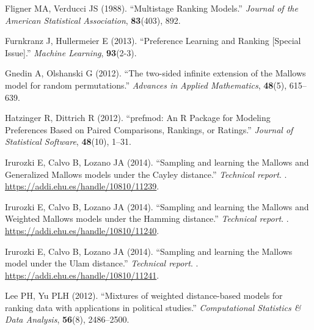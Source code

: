 \documentclass[article,nojss]{jss}
\begin{document}
\begin{thebibliography}{36}
Fligner MA, Verducci JS (1988).
\newblock \enquote{{Multistage Ranking Models}.}
\newblock \emph{Journal of the American Statistical Association},
  \textbf{83}(403), 892.

Furnkranz J, Hullermeier E (2013).
\newblock \enquote{{Preference Learning and Ranking [Special Issue]}.}
\newblock \emph{Machine Learning}, \textbf{93}(2-3).

Gnedin A, Olshanski G (2012).
\newblock \enquote{{The two-sided infinite extension of the Mallows model for
  random permutations}.}
\newblock \emph{Advances in Applied Mathematics}, \textbf{48}(5), 615--639.

Hatzinger R, Dittrich R (2012).
\newblock \enquote{{prefmod: An R Package for Modeling Preferences Based on
  Paired Comparisons, Rankings, or Ratings}.}
\newblock \emph{Journal of Statistical Software}, \textbf{48}(10), 1--31.

Irurozki E, Calvo B, Lozano JA (2014{}).
\newblock \enquote{{Sampling and learning the Mallows and Generalized Mallows
  models under the Cayley distance}.}
\newblock \emph{Technical report}.
\newblock {}.
\newblock \urlprefix\url{https://addi.ehu.es/handle/10810/11239}.

Irurozki E, Calvo B, Lozano JA (2014{}).
\newblock \enquote{{Sampling and learning the Mallows and Weighted Mallows
  models under the Hamming distance}.}
\newblock \emph{Technical report}.
\newblock {}.
\newblock \urlprefix\url{https://addi.ehu.es/handle/10810/11240}.

Irurozki E, Calvo B, Lozano JA (2014{}).
\newblock \enquote{{Sampling and learning the Mallows model under the Ulam
  distance}.}
\newblock \emph{Technical report}.
\newblock {}.
\newblock \urlprefix\url{https://addi.ehu.es/handle/10810/11241}.

Lee PH, Yu PLH (2012).
\newblock \enquote{{Mixtures of weighted distance-based models for ranking data
  with applications in political studies}.}
\newblock \emph{Computational Statistics \& Data Analysis}, \textbf{56}(8),
  2486--2500.


\end{thebibliography}
\end{document}
